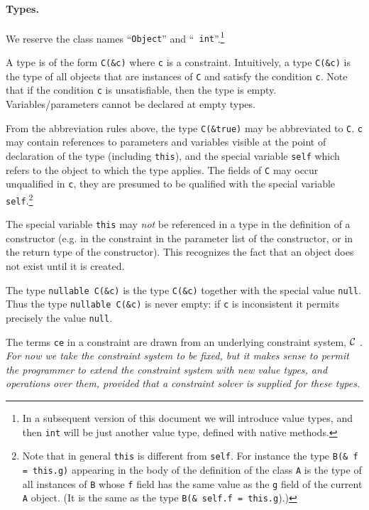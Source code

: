 \documentclass{article}
\begin{document}
\paragraph{Types.}
We reserve the class names ``{\tt Object}'' and ``{\tt
int}''.\footnote{In a subsequent version of this document we will
introduce value types, and then {\tt int} will be just another value
type, defined with native methods.}

A type is of the form {\tt C(\&c)} where {\tt c} is a constraint.
Intuitively, a type {\tt C(\&c)} is the type of all objects that are
instances of {\tt C} and satisfy the condition {\tt c}. Note that if
the condition {\tt c} is unsatisfiable, then the type is
empty. Variables/parameters cannot be declared at empty types.

From the abbreviation rules above, the type {\tt C(\&true)} may be
abbreviated to {\tt C}.  {\tt c} may contain references to parameters
and variables visible at the point of declaration of the type
(including {\tt this}), and the special variable {\tt self} which
refers to the object to which the type applies.  The fields of {\tt C}
may occur unqualified in {\tt c}, they are presumed to be qualified with the
special variable {\tt self}.\footnote{
Note that in general {\tt this} is
different from {\tt self}.  For instance the type {\tt B(\& f =
this.g)} appearing in the body of the definition of the class {\tt A}
is the type of all instances of {\tt B} whose {\tt f} field has the
same value as the {\tt g} field of the current {\tt A} object. (It is
the same as the type {\tt B(\& self.f = this.g}).)}

The special variable {\tt this} may {\em not} be referenced in a type
in the definition of a constructor (e.g.{} in the constraint in the
parameter list of the constructor, or in the return type of the
constructor). This recognizes the fact that an object does not exist
until it is created. 

The type {\tt nullable C(\&c)} is the type {\tt C(\&c)} together with
the special value {\tt null}. Thus the type {\tt nullable C(\&c)} is
never empty: if {\tt c} is inconsistent it permits precisely the value
{\tt null}.

The terms {\tt ce} in a constraint are drawn from an underlying
constraint system, $\cal C$ \cite{cccc}. {\em For now we take the
constraint system to be fixed, but it makes sense to permit the
programmer to extend the constraint system with new value types, and
operations over them, provided that a constraint solver is supplied
for these types.}
\end{document}
